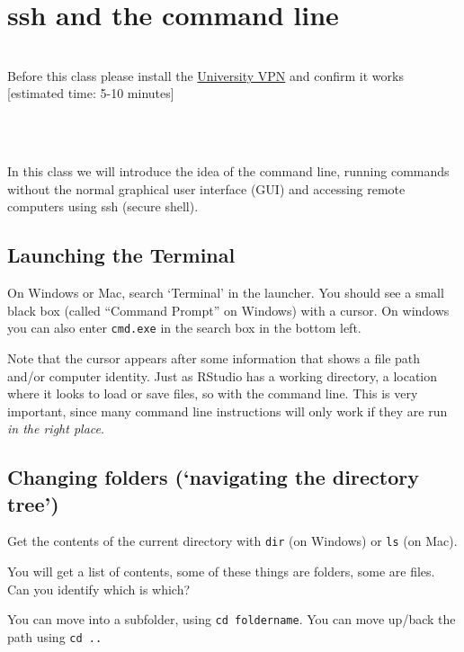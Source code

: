 \documentclass[
]{book}
\newenvironment{info}
    {
    \hline\\
    }
    { 
    \\\\\hline
    }
\begin{document}
\hypertarget{ssh-and-the-command-line}{%
\chapter{ssh and the command line}\label{ssh-and-the-command-line}}

\begin{info}
Before this class please install the
\href{https://www.sheffield.ac.uk/it-services/vpn}{University VPN} and
confirm it works {[}estimated time: 5-10 minutes{]}
\end{info}

In this class we will introduce the idea of the command line, running commands without the normal graphical user interface (GUI) and accessing remote computers using ssh (secure shell).

\hypertarget{launching-the-terminal}{%
\section{Launching the Terminal}\label{launching-the-terminal}}

On Windows or Mac, search `Terminal' in the launcher. You should see a small black box (called ``Command Prompt'' on Windows) with a cursor. On windows you can also enter \texttt{cmd.exe} in the search box in the bottom left.

Note that the cursor appears after some information that shows a file path and/or computer identity. Just as RStudio has a working directory, a location where it looks to load or save files, so with the command line. This is very important, since many command line instructions will only work if they are run \emph{in the right place}.

\hypertarget{changing-folders-navigating-the-directory-tree}{%
\section{Changing folders (`navigating the directory tree')}\label{changing-folders-navigating-the-directory-tree}}

Get the contents of the current directory with \texttt{dir} (on Windows) or \texttt{ls} (on Mac).

You will get a list of contents, some of these things are folders, some are files. Can you identify which is which?

You can move into a subfolder, using \texttt{cd\ foldername}. You can move up/back the path using \texttt{cd\ ..}
\end{document}

